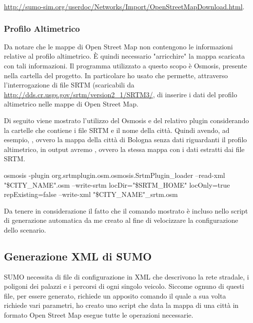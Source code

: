 \url{http://sumo-sim.org/userdoc/Networks/Import/OpenStreetMapDownload.html}.

\subsubsection{Profilo Altimetrico}\label{profilo-altimetrico}

Da notare che le mappe di Open Street Map non contengono le informazioni relative al profilo altimetrico. È quindi necessario "arricchire" la mappa scaricata con tali informazioni. Il programma utilizzato a questo scopo è Osmosis, presente nella cartella  del progetto. In particolare ho usato  che permette, attraverso l'interrogazione di file SRTM (scaricabili da \url{http://dds.cr.usgs.gov/srtm/version2_1/SRTM3/}, di inserire i dati del profilo altimetrico nelle mappe di Open Street Map. 

Di seguito viene mostrato l'utilizzo del Osmosis e del relativo plugin considerando  la cartelle che contiene i file SRTM e  il nome della città. Quindi avendo, ad esempio, , ovvero la mappa della città di Bologna senza dati riguardanti il profilo altimetrico, in output avremo , ovvero la stessa mappa con i dati estratti dai file SRTM.

\begin{bash}
osmosis -plugin org.srtmplugin.osm.osmosis.SrtmPlugin_loader --read-xml "\$CITY_NAME".osm --write-srtm locDir="\$SRTM_HOME" locOnly=true repExisting=false --write-xml "\$CITY_NAME"_srtm.osm
\end{bash}

%

Da tenere in considerazione il fatto che il comando mostrato è incluso nello script di generazione automatica da me creato al fine di velocizzare la configurazione dello scenario.

\subsection{Generazione XML di SUMO}

SUMO necessita di file di configurazione in XML che descrivono la rete stradale, i poligoni dei palazzi e i percorsi di ogni singolo veicolo. Siccome ognuno di questi file, per essere generato, richiede un apposito comando il quale a sua volta richiede vari parametri, ho creato uno script che data la mappa di una città in formato Open Street Map esegue tutte le operazioni necessarie.

